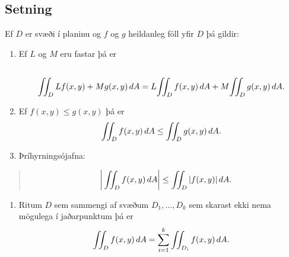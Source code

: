 \documentclass[a4paper,10pt,icelandic]{sphinxmanual}
\begin{document}
\subsection{Setning}
\label{Kafli4:id5}
Ef \(D\) er svæði í planinu og \(f\) og \(g\) heildanleg
föll yfir \(D\) þá gildir:
\begin{enumerate}
\item {} 
Ef \(L\) og \(M\) eru fastar þá er
\begin{gather}
\begin{split}\displaystyle\end{split}\notag\\\begin{split}\int\!\!\!\int_D Lf(x,y)+Mg(x,y)\,dA=L\!\int\!\!\!\int_D f(x,y)\,dA+M\!\int\!\!\!\int_D
g(x,y)\,dA.\end{split}\notag
\end{gather}
\item {} 
Ef \(f(x,y)\leq g(x,y)\) þá er
\begin{gather}
\begin{split}\displaystyle \int\!\!\!\int_D f(x,y)\,dA\leq \int\!\!\!\int_Dg(x,y)\,dA.\end{split}\notag
\end{gather}
\item {} 
Þríhyrningsójafna:

\end{enumerate}
\begin{quote}
\begin{gather}
\begin{split}\bigg|\int\!\!\!\int_D f(x,y)\,dA\bigg|\leq \int\!\!\!\int_D |f(x,y)|\,dA.\end{split}\notag
\end{gather}\end{quote}
\begin{enumerate}
\item {} 
Ritum \(D\) sem sammengi af svæðum \(D_1,\ldots, D_k\) sem
skarast ekki nema mögulega í jaðarpunktum þá er
\begin{gather}
\begin{split}\displaystyle \int\!\!\!\int_D f(x,y)\,dA=\sum_{i=1}^k\int\!\!\!\int_{D_i}f(x,y)\,dA.\end{split}\notag
\end{gather}
\end{enumerate}

\end{document}

